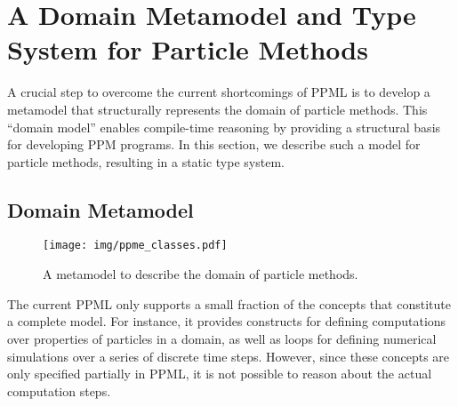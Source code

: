\section{A Domain Metamodel and Type System for Particle Methods}
\label{sec:model-and-type-system}
A crucial step to overcome the current shortcomings of PPML is to develop a metamodel that 
structurally represents the domain of particle methods.  This ``domain model'' enables compile-time reasoning by providing a
structural basis for developing PPM programs. In this section, we describe such a model for particle methods, 
resulting in a static type system.

\subsection{Domain Metamodel}
\label{sec:domain-metamodel}%
%
\begin{figure}%
\texttt{[image: img/ppme\_classes.pdf]}%
\caption{A metamodel to describe the domain of particle methods.}%
\label{fig:domain-model}%
\end{figure}%
%
The current PPML only supports a small fraction of the concepts that 
constitute a complete model. For instance, it provides constructs for defining computations over properties 
of particles in a domain, as well as loops for defining numerical simulations over a series of discrete time steps.
However, since these concepts are only specified partially in PPML, it is not possible to reason about the actual
computation steps. 


